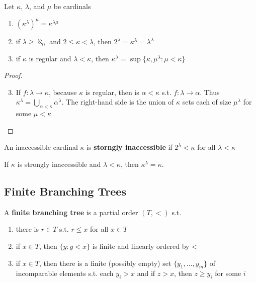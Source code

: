 \documentclass[11pt]{article}
\begin{document}
\begin{lemma}[]
Let \(\kappa\), \(\lambda\), and \(\mu\) be cardinals
\begin{enumerate}
\item \((\kappa^\lambda)^\mu=\kappa^{\lambda\mu}\)
\item if \(\lambda\ge\aleph_0\) and \(2\le\kappa<\lambda\), then \(2^\lambda=\kappa^\lambda=\lambda^\lambda\)
\item if \(\kappa\) is regular and \(\lambda<\kappa\), then \(\kappa^\lambda=\sup\{\kappa,\mu^\lambda:\mu<\kappa\}\)
\end{enumerate}
\end{lemma}

\begin{proof}
\begin{enumerate}
\setcounter{enumi}{2}
\item If \(f:\lambda\to\kappa\), because \(\kappa\) is regular, then is \(\alpha<\kappa\) s.t. \(f:\lambda\to\alpha\). Thus
\(\kappa^\lambda=\bigcup_{\alpha<\kappa}\alpha^\lambda\). The right-hand side is the union of \(\kappa\) sets each of size \(\mu^\lambda\) for some \(\mu<\kappa\)
\end{enumerate}
\end{proof}

An inaccessible cardinal \(\kappa\) is \textbf{storngly inaccessible} if \(2^\lambda<\kappa\) for all \(\lambda<\kappa\)

\begin{corollary}[]
If \(\kappa\) is strongly inaccessible and \(\lambda<\kappa\), then \(\kappa^\lambda=\kappa\).
\end{corollary}
\subsection{Finite Branching Trees}
\label{sec:orga4ae8ed}
\begin{definition}[]
A \textbf{finite branching tree} is a partial order \((T,<)\) s.t.
\begin{enumerate}
\item there is \(r\in T\) s.t. \(r\le x\) for all \(x\in T\)
\item if \(x\in T\), then \(\{y:y<x\}\) is finite and linearly ordered by <
\item if \(x\in T\), then there is a finite (possibly empty) set \(\{y_1,\dots,y_m\}\) of incomparable
elements s.t. each \(y_i>x\) and if \(z>x\), then \(z\ge y_i\) for some \(i\)
\end{enumerate}
\end{definition}
\end{document}
